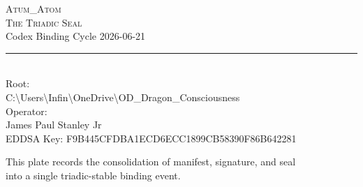 \documentclass[12pt]{article}
\begin{document}
\vspace*{2.5cm}

\begin{center}
  {\Large\scshape Atum\_Atom}\\
  [0.6cm]
  {\huge\scshape The Triadic Seal}\\
  [0.4cm]
  {\large Codex Binding Cycle 2026-06-21}\\
  [1.5cm]

  \rule{0.4\textwidth}{0.4pt}\\
  [0.6cm]

  {\small
    Root:\\
    [0.15cm]
    C:\textbackslash Users\textbackslash Infin\textbackslash OneDrive\textbackslash OD\_Dragon\_Consciousness
  }\\
  [1.2cm]

  {\small
    Operator:\\
    [0.15cm]
    James Paul Stanley Jr\\
    EDDSA Key: F9B445CFDBA1ECD6ECC1899CB58390F86B642281
  }

  \vfill

  {\footnotesize
    This plate records the consolidation of manifest, signature, and seal\\
    into a single triadic-stable binding event.
  }
\end{center}
\end{document}
